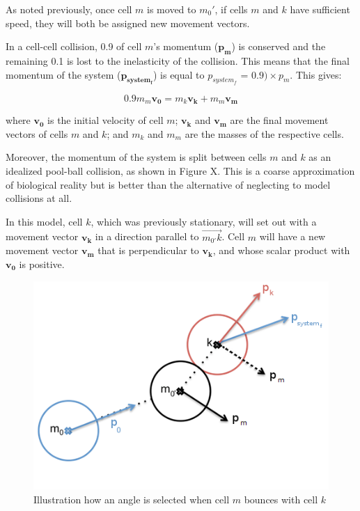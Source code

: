\documentclass[12pt]{article}
\begin{document}
As noted previously, once cell \(m\) is moved to \(m_0'\), if 
cells \(m\) and \(k\) have sufficient speed, they will both be assigned new movement vectors.

In a cell-cell collision, 0.9 of cell \(m\)'s momentum (\(\mathbf{p_m}\)) is conserved and the 
remaining 0.1 is lost to the inelasticity of the collision. This means that the final momentum 
of the system (\(\mathbf{p_{system_f}}\)) is equal to \(p_{system_f}\) = \(0.9) \times p_m\). 
This gives:

\begin{equation}
  0.9m_m\mathbf{v_0} = m_k\mathbf{v_k}+m_m\mathbf{v_m}
\end{equation}

where \(\mathbf{v_0}\) is the initial velocity of cell \(m\);
\(\mathbf{v_k}\) and \(\mathbf{v_m}\) are the final movement vectors of cells \(m\) and \(k\); and \(m_k\) and
\(m_m\) are the masses of the respective cells.

Moreover, the momentum of the system is split between cells \(m\) and \(k\) as an idealized 
pool-ball collision, as shown in Figure X. This is a coarse approximation of biological 
reality but is better than the alternative of neglecting to model collisions at all. 

In this model, cell \(k\), which was previously stationary, will 
set out with a movement vector \(\mathbf{v_k}\) in a direction parallel to \(\overrightarrow{m_{0'}k}\).
Cell \(m\) will have a new movement vector \(\mathbf{v_m}\) 
that is perpendicular to \(\mathbf{v_k}\), and whose scalar product with \(\mathbf{v_0}\) 
is positive.

\begin{figure}[H]
\centering
\includegraphics[width=12.25cm,height=7.94cm]{media/cellcollide.png}
\caption{Illustration how an angle is selected when cell \(m\) bounces with cell \(k\)}
\end{figure}
\end{document}
